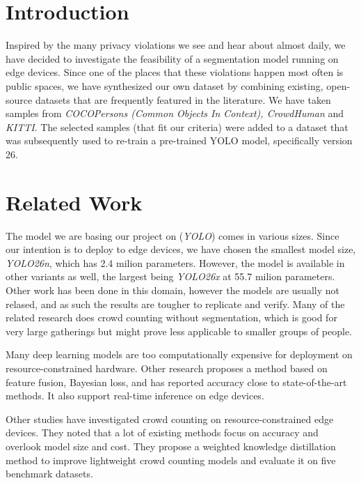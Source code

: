 \documentclass{proc}
\begin{document}
\section{Introduction} %

Inspired by the many privacy violations we see and hear about almost daily, we have decided to investigate the feasibility of a segmentation model running on edge devices. Since one of the places that these violations happen  most often is public spaces, we have synthesized our own dataset by combining existing, open-source datasets that are frequently featured in the literature. We have taken samples from \textit{COCOPersons (Common Objects In Context), CrowdHuman} and \textit{KITTI}. The selected samples (that fit our criteria) were added to a dataset that was subsequently used to re-train a pre-trained YOLO\cite{YOLO} model, specifically version 26\cite{YOLO26}.

\section{Related Work} %

The model we are basing our project on (\textit{YOLO}) comes in various sizes. Since our intention is to deploy to edge devices, we have chosen the smallest model size, \textit{YOLO26n}, which has 2.4 milion parameters. However, the model is available in other variants as well, the largest being \textit{YOLO26x} at 55.7 milion parameters. Other work has been done in this domain\cite{santos2025wireless}\cite{oneshot}, however the models are usually not relased, and as such the results are tougher to replicate and verify. Many of the related research does crowd counting without segmentation\cite{UAV}\cite{RepSFNet}, which is good for very large gatherings but might prove less applicable to smaller groups of people.

Many deep learning models are too computationally expensive for deployment on resource-constrained hardware. Other research proposes\cite{crowd_counting_01} a method based on feature fusion, Bayesian loss, and has reported accuracy close to state-of-the-art methods. It also support real-time inference on edge devices.

Other studies\cite{UAV} have investigated crowd counting on resource-constrained edge devices. They noted that a lot of existing methods focus on accuracy and overlook model size and cost. They propose a weighted knowledge distillation method to improve lightweight crowd counting models and evaluate it on five benchmark datasets.
\end{document}
